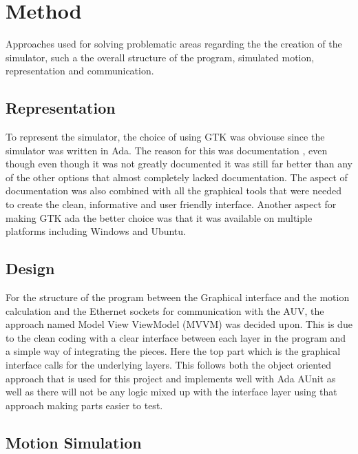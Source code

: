 \section{Method}\label{sec:method}

Approaches used for solving problematic areas regarding the the creation of the simulator, such a the overall structure of the program, simulated motion, representation and communication.


\subsection{Representation}

To represent the simulator, the choice of using GTK was obviouse since the simulator was written in Ada. The reason for this was documentation , even though even though it was not greatly documented it was still far better than any of the other options that almost completely lacked documentation. The aspect of documentation was also combined with all the graphical tools that were needed to create the clean, informative and user friendly interface. Another aspect for making GTK ada the better choice was that it was available on multiple platforms including Windows and Ubuntu.
\subsection{Design}

For the structure of the program between the Graphical interface and the motion calculation and the Ethernet sockets for communication with the AUV, the approach named Model View ViewModel (MVVM) was decided upon. This is due to the clean coding with a clear interface between each layer in the program and a simple way of integrating the pieces. Here the top part which is the graphical interface calls for the underlying layers. This follows both the object oriented approach that is used for this project and implements well with Ada AUnit as well as there will not be any logic mixed up with the interface layer using that approach making parts easier to test.
\subsection{Motion Simulation}

